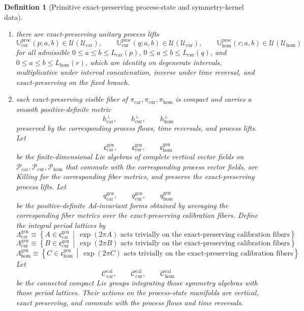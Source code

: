 \documentclass[11pt]{article}
\newcommand{\RootTensorClass}{\mathscr U_{\mathrm{car}}}
\newcommand{\RootRelabelClass}{\mathscr U_{\mathrm{cur}}}
\newcommand{\RootFreeClass}{\mathscr U_{\mathrm{hom}}}
\newcommand{\TensorCalGroup}{\mathcal C_{\mathrm{car}}^{\mathrm{cal}}}
\newcommand{\CurCalGroup}{\mathcal C_{\mathrm{cur}}^{\mathrm{cal}}}
\newcommand{\HomCalGroup}{\mathcal C_{\mathrm{hom}}^{\mathrm{cal}}}
\newcommand{\TensorCalLie}{\mathfrak c_{\mathrm{car}}^{\mathrm{gen}}}
\newcommand{\CurCalLie}{\mathfrak c_{\mathrm{cur}}^{\mathrm{gen}}}
\newcommand{\HomCalLie}{\mathfrak c_{\mathrm{hom}}^{\mathrm{gen}}}
\newcommand{\TensorCalMetric}{q_{\mathrm{car}}^{\mathrm{gen}}}
\newcommand{\CurCalMetric}{q_{\mathrm{cur}}^{\mathrm{gen}}}
\newcommand{\HomCalMetric}{q_{\mathrm{hom}}^{\mathrm{gen}}}
\newcommand{\TensorCalLat}{\Lambda_{\mathrm{car}}^{\mathrm{gen}}}
\newcommand{\CurCalLat}{\Lambda_{\mathrm{cur}}^{\mathrm{gen}}}
\newcommand{\HomCalLat}{\Lambda_{\mathrm{hom}}^{\mathrm{gen}}}
\newcommand{\TensorProcSpace}{\mathcal P_{\mathrm{car}}}
\newcommand{\CurProcSpace}{\mathcal P_{\mathrm{cur}}}
\newcommand{\HomProcSpace}{\mathcal P_{\mathrm{hom}}}
\newcommand{\TensorProcRead}{\pi_{\mathrm{car}}}
\newcommand{\CurProcRead}{\pi_{\mathrm{cur}}}
\newcommand{\HomProcRead}{\pi_{\mathrm{hom}}}
\newcommand{\TensorProcLength}{L_{\mathrm{car}}}
\newcommand{\CurProcLength}{L_{\mathrm{cur}}}
\newcommand{\HomProcLength}{L_{\mathrm{hom}}}
\newcommand{\HomProcTimeRev}{\chi_{\mathrm{hom}}}
\newcommand{\TensorProcMetric}{h_{\mathrm{car}}^{\perp}}
\newcommand{\CurProcMetric}{h_{\mathrm{cur}}^{\perp}}
\newcommand{\HomProcMetric}{h_{\mathrm{hom}}^{\perp}}
\newcommand{\TensorProcLift}{\mathbb U_{\mathrm{car}}^{\mathrm{proc}}}
\newcommand{\CurProcLift}{\mathbb U_{\mathrm{cur}}^{\mathrm{proc}}}
\newcommand{\HomProcLift}{\mathbb U_{\mathrm{hom}}^{\mathrm{proc}}}
\newtheorem{definition}{Definition}
\begin{document}
\begin{definition}[Primitive exact-preserving process-state and symmetry-kernel data]
\begin{enumerate}
\[    \HomProcRead\circ\HomProcTimeRev=\HomProcRead.
    \]
    \item there are exact-preserving unitary process lifts
    \[
    \TensorProcLift(p;a,b)\in\mathcal U(\RootTensorClass),\qquad
    \CurProcLift(q;a,b)\in\mathcal U(\RootRelabelClass),\qquad
    \HomProcLift(r;a,b)\in\mathcal U(\RootFreeClass)
    \]
    for all admissible \(0\le a\le b\le \TensorProcLength(p)\), \(0\le a\le b\le \CurProcLength(q)\), and \(0\le a\le b\le \HomProcLength(r)\), which are identity on degenerate intervals, multiplicative under interval concatenation, inverse under time reversal, and exact-preserving on the fixed branch.
    \item each exact-preserving visible fiber of \(\TensorProcRead,\CurProcRead,\HomProcRead\) is compact and carries a smooth positive-definite metric
    \[
    \TensorProcMetric,\qquad
    \CurProcMetric,\qquad
    \HomProcMetric
    \]
    preserved by the corresponding process flows, time reversals, and process lifts. Let
    \[
    \TensorCalLie,\qquad
    \CurCalLie,\qquad
    \HomCalLie
    \]
    be the finite-dimensional Lie algebras of complete vertical vector fields on \(\TensorProcSpace,\CurProcSpace,\HomProcSpace\) that commute with the corresponding process vector fields, are Killing for the corresponding fiber metrics, and preserve the exact-preserving process lifts. Let
    \[
    \TensorCalMetric,\qquad
    \CurCalMetric,\qquad
    \HomCalMetric
    \]
    be the positive-definite Ad-invariant forms obtained by averaging the corresponding fiber metrics over the exact-preserving calibration fibers. Define the integral period lattices by
    \begin{equation}
    \TensorCalLat
    \equiv
    \left\{
    A\in\TensorCalLie\,\middle|\,
    \exp(2\pi A)\text{ acts trivially on the exact-preserving calibration fibers}
    \right\},
    \label{eq:period_lattice_car}
    \end{equation}
    \begin{equation}
    \CurCalLat
    \equiv
    \left\{
    B\in\CurCalLie\,\middle|\,
    \exp(2\pi B)\text{ acts trivially on the exact-preserving calibration fibers}
    \right\},
    \label{eq:period_lattice_cur}
    \end{equation}
    \begin{equation}
    \HomCalLat
    \equiv
    \left\{
    C\in\HomCalLie\,\middle|\,
    \exp(2\pi C)\text{ acts trivially on the exact-preserving calibration fibers}
    \right\}.
    \label{eq:period_lattice_hom}
    \end{equation}
    Let
    \[
    \TensorCalGroup,\qquad
    \CurCalGroup,\qquad
    \HomCalGroup
    \]
    be the connected compact Lie groups integrating those symmetry algebras with those period lattices. Their actions on the process-state manifolds are vertical, exact preserving, and commute with the process flows and time reversals.
\end{enumerate}


\end{definition}
\end{document}
